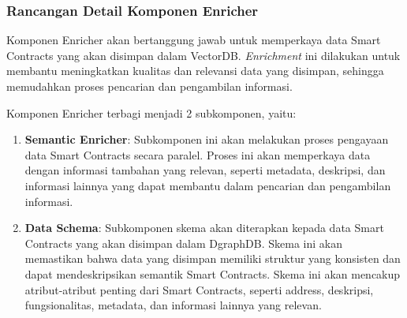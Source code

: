 

\subsubsection{Rancangan Detail Komponen Enricher}

Komponen Enricher akan bertanggung jawab untuk memperkaya data Smart Contracts yang akan disimpan dalam VectorDB. \textit{Enrichment} ini dilakukan untuk membantu meningkatkan kualitas dan relevansi data yang disimpan, sehingga memudahkan proses pencarian dan pengambilan informasi.

Komponen Enricher terbagi menjadi 2 subkomponen, yaitu:
\begin{enumerate}
	\item \textbf{Semantic Enricher}: Subkomponen ini akan melakukan proses pengayaan data Smart Contracts secara paralel. Proses ini akan memperkaya data dengan informasi tambahan yang relevan, seperti metadata, deskripsi, dan informasi lainnya yang dapat membantu dalam pencarian dan pengambilan informasi.
	\item \textbf{Data Schema}:
	      Subkomponen skema akan diterapkan kepada data Smart Contracts yang akan disimpan dalam DgraphDB. Skema ini akan memastikan bahwa data yang disimpan memiliki struktur yang konsisten dan dapat mendeskripsikan semantik Smart Contracts. Skema ini akan mencakup atribut-atribut penting dari Smart Contracts, seperti address, deskripsi, fungsionalitas, metadata, dan informasi lainnya yang relevan.
\end{enumerate}

